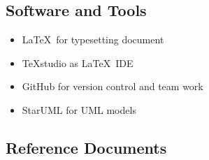 \subsection{Software and Tools}
	\begin{itemize}
	\item
		\LaTeX\ for typesetting document
	\item
		TeXstudio as \LaTeX\ IDE
	\item
		GitHub for version control and team work
	\item
		StarUML for UML models
	\end{itemize}
\subsection{Reference Documents}
